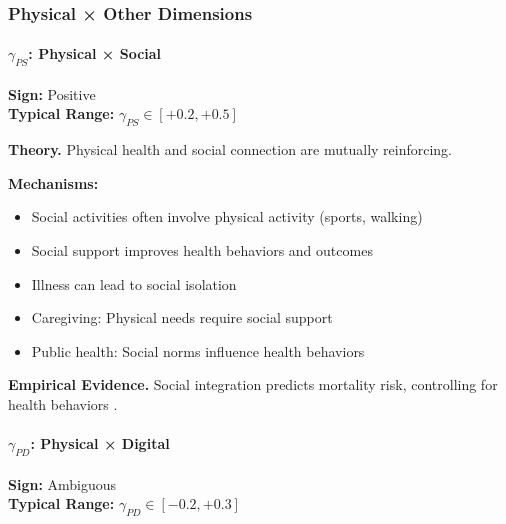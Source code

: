 
\subsubsection{Physical × Other Dimensions}

\paragraph{$\gamma_{PS}$: Physical × Social}

\begin{tcolorbox}[colback=green!5, colframe=green!50!black]
\textbf{Sign:} Positive \\
\textbf{Typical Range:} $\gamma_{PS} \in [+0.2, +0.5]$
\end{tcolorbox}

\textbf{Theory.}
Physical health and social connection are mutually reinforcing.

\textbf{Mechanisms:}
\begin{itemize}
    \item Social activities often involve physical activity (sports, walking)
    \item Social support improves health behaviors and outcomes
    \item Illness can lead to social isolation
    \item Caregiving: Physical needs require social support
    \item Public health: Social norms influence health behaviors
\end{itemize}

\textbf{Empirical Evidence.}
Social integration predicts mortality risk, controlling for health behaviors 
\citep{holt2010social}.


\paragraph{$\gamma_{PD}$: Physical × Digital}

\begin{tcolorbox}[colback=yellow!5, colframe=yellow!50!black]
\textbf{Sign:} Ambiguous \\
\textbf{Typical Range:} $\gamma_{PD} \in [-0.2, +0.3]$
\end{tcolorbox}

